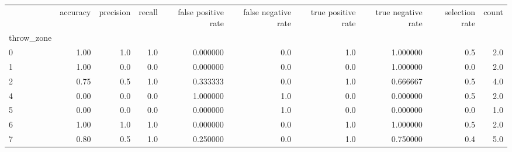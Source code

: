 \begin{tabular}{lrrrrrrrrr}
\toprule
{} &  accuracy &  precision &  recall &  false positive rate &  false negative rate &  true positive rate &  true negative rate &  selection rate &  count \\
throw\_zone &           &            &         &                      &                      &                     &                     &                 &        \\
\midrule
0          &      1.00 &        1.0 &     1.0 &             0.000000 &                  0.0 &                 1.0 &            1.000000 &             0.5 &    2.0 \\
1          &      1.00 &        0.0 &     0.0 &             0.000000 &                  0.0 &                 0.0 &            1.000000 &             0.0 &    2.0 \\
2          &      0.75 &        0.5 &     1.0 &             0.333333 &                  0.0 &                 1.0 &            0.666667 &             0.5 &    4.0 \\
4          &      0.00 &        0.0 &     0.0 &             1.000000 &                  1.0 &                 0.0 &            0.000000 &             0.5 &    2.0 \\
5          &      0.00 &        0.0 &     0.0 &             0.000000 &                  1.0 &                 0.0 &            0.000000 &             0.0 &    1.0 \\
6          &      1.00 &        1.0 &     1.0 &             0.000000 &                  0.0 &                 1.0 &            1.000000 &             0.5 &    2.0 \\
7          &      0.80 &        0.5 &     1.0 &             0.250000 &                  0.0 &                 1.0 &            0.750000 &             0.4 &    5.0 \\
\bottomrule
\end{tabular}
